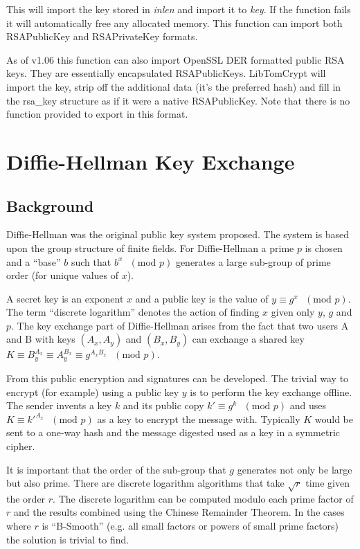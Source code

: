 \documentclass[synpaper]{book}
\begin{document}
This will import the key stored in \textit{inlen} and import it to \textit{key}.  If the function fails it will automatically free any allocated memory.  This
function can import both RSAPublicKey and RSAPrivateKey formats.

As of v1.06 this function can also import OpenSSL DER formatted public RSA keys.  They are essentially encapsulated RSAPublicKeys.  LibTomCrypt will
import the key, strip off the additional data (it's the preferred hash) and fill in the rsa\_key structure as if it were a native RSAPublicKey.  Note that
there is no function provided to export in this format.  


\chapter{Diffie-Hellman Key Exchange}

\section{Background}

Diffie-Hellman was the original public key system proposed.  The system is based upon the group structure
of finite fields.  For Diffie-Hellman a prime $p$ is chosen and a ``base'' $b$ such that $b^x\mbox{ }(\mbox{mod }p)$ 
generates a large sub-group of prime order (for unique values of $x$).

A secret key is an exponent $x$ and a public key is the value of $y \equiv g^x\mbox{ }(\mbox{mod }p)$.  The term
``discrete logarithm'' denotes the action of finding $x$ given only $y$, $g$ and $p$.  The key exchange part of
Diffie-Hellman arises from the fact that two users A and B with keys $(A_x, A_y)$ and $(B_x, B_y)$ can exchange 
a shared key $K \equiv B_y^{A_x} \equiv A_y^{B_x} \equiv g^{A_xB_x}\mbox{ }(\mbox{mod }p)$.

From this public encryption and signatures can be developed.  The trivial way to encrypt (for example) using a public key 
$y$ is to perform the key exchange offline.  The sender invents a key $k$ and its public copy 
$k' \equiv g^k\mbox{ }(\mbox{mod }p)$ and uses $K \equiv k'^{A_x}\mbox{ }(\mbox{mod }p)$ as a key to encrypt
the message with.  Typically $K$ would be sent to a one-way hash and the message digested used as a key in a 
symmetric cipher.

It is important that the order of the sub-group that $g$ generates not only be large but also prime.  There are
discrete logarithm algorithms that take $\sqrt r$ time given the order $r$.  The discrete logarithm can be computed
modulo each prime factor of $r$ and the results combined using the Chinese Remainder Theorem.  In the cases where 
$r$ is ``B-Smooth'' (e.g. all small factors or powers of small prime factors) the solution is trivial to find.
\end{document}
